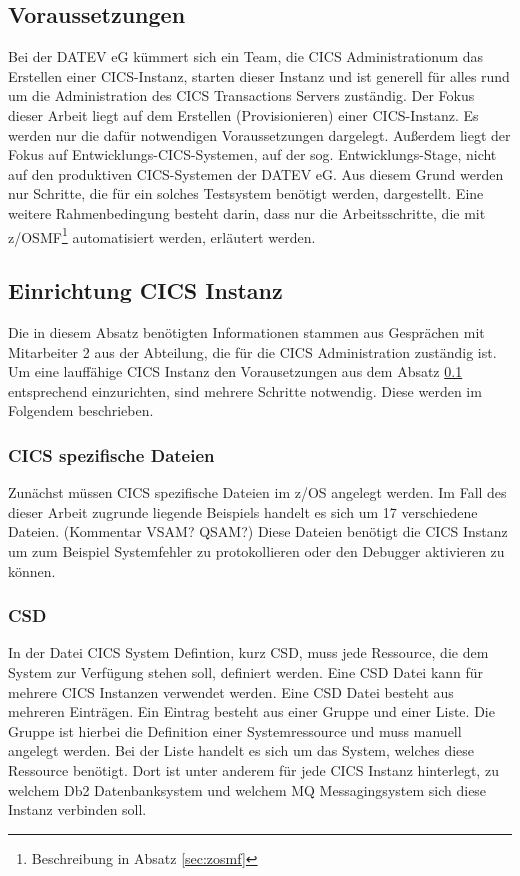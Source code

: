 \subsection{Voraussetzungen}\label{subsec:voraus}
Bei der DATEV eG kümmert sich ein Team, die \glqq CICS Administration\grqq{}um das Erstellen einer CICS-Instanz, starten dieser Instanz und ist generell für alles rund um die Administration des CICS Transactions Servers zuständig.
Der Fokus dieser Arbeit liegt auf dem Erstellen (\glqq Provisionieren\grqq{}) einer CICS-Instanz. Es werden nur die dafür notwendigen Voraussetzungen dargelegt.
Außerdem liegt der Fokus auf Entwicklungs-CICS-Systemen, auf der sog. Entwicklungs-Stage, nicht auf den produktiven CICS-Systemen der DATEV eG. 
Aus diesem Grund werden nur Schritte, die für ein solches Testsystem benötigt werden, dargestellt.
Eine weitere Rahmenbedingung besteht darin, dass nur die Arbeitsschritte, die mit z/OSMF\footnote{Beschreibung in Absatz \ref{sec:zosmf}} automatisiert werden, erläutert werden.

\subsection{Einrichtung CICS Instanz}\label{subsec:createCICS}
Die in diesem Absatz benötigten Informationen stammen aus Gesprächen mit Mitarbeiter 2 aus der Abteilung, die für die CICS Administration zuständig ist.
Um eine lauffähige CICS Instanz den Vorausetzungen aus dem Absatz \ref{subsec:voraus} entsprechend einzurichten, sind mehrere Schritte notwendig.
Diese werden im Folgendem beschrieben.

\subsubsection{CICS spezifische Dateien}\label{sssec:speziDat}
Zunächst müssen CICS spezifische Dateien im z/OS angelegt werden.
Im Fall des dieser Arbeit zugrunde liegende Beispiels handelt es sich um 17 verschiedene Dateien. (Kommentar VSAM? QSAM?)
Diese Dateien benötigt die CICS Instanz um zum Beispiel Systemfehler zu protokollieren oder den Debugger aktivieren zu können.


\subsubsection{CSD}
In der Datei \glqq CICS System Defintion\grqq, kurz CSD, muss jede Ressource, die dem System zur Verfügung stehen soll, definiert werden.
Eine CSD Datei kann für mehrere CICS Instanzen verwendet werden.
Eine CSD Datei besteht aus mehreren Einträgen.
Ein Eintrag besteht aus einer Gruppe und einer Liste.
Die Gruppe ist hierbei die Definition einer Systemressource und muss manuell angelegt werden.
Bei der Liste handelt es sich um das System, welches diese Ressource benötigt.
Dort ist unter anderem für jede CICS Instanz hinterlegt, zu welchem Db2 Datenbanksystem und welchem MQ Messagingsystem sich diese Instanz verbinden soll.

